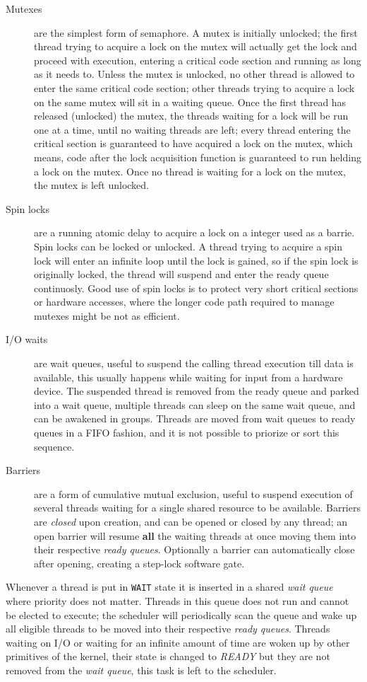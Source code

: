 \documentclass[11pt,b5paper]{scrbook}
\begin{document}
\begin{description}
\item[Mutexes] are the simplest form of semaphore. A mutex is initially
unlocked; the first thread trying to acquire a lock on the mutex will actually get the lock
and proceed with execution, entering a critical code section and running as long as it needs to.
Unless the mutex is unlocked, no other thread is allowed to enter the same
critical code section; other threads trying to acquire a lock on the same mutex will sit in a
waiting queue. 
Once the first thread has released (unlocked) the mutex, the threads waiting for 
a lock will be run one at a time, until no waiting threads are left; every thread entering the
critical section is guaranteed to have acquired a lock on the mutex, which means, 
code after the lock acquisition function is guaranteed to run helding a lock on the mutex.
Once no thread is waiting for a lock on the mutex, the mutex is left unlocked.
\item[Spin locks] are a running  atomic delay to acquire a lock on a integer used as a
barrie. Spin locks can be locked or unlocked.
A thread trying to acquire a spin lock will enter an infinite loop until the lock is 
gained, so if the spin lock is originally locked, the thread will suspend and enter
the ready queue continuosly.
Good use of spin locks is to protect very short critical sections or hardware accesses,
where the longer code path required to manage mutexes might be not as efficient.
\item[I/O waits] are wait queues, useful to suspend the calling thread execution till 
data is available, this usually happens while waiting for input from a hardware device.
The suspended thread is removed from the ready queue and parked into a wait queue, multiple
threads can sleep on the same wait queue, and can be awakened in groups.
Threads are moved from wait queues to ready queues in a FIFO fashion, and it is not possible
to priorize or sort this sequence.
\item[Barriers] are a form of cumulative mutual exclusion, useful to suspend execution of several
threads waiting for a single shared resource to be available.
Barriers are \textit{closed} upon creation, and can be opened or closed by any thread; an open barrier will
resume \textbf{all} the waiting threads at once moving them into their respective \textit{ready queues}.
Optionally a barrier can automatically close after opening, creating a step-lock software gate.
\end{description}

Whenever a thread is put in \texttt{WAIT} state it is inserted in a shared \textit{wait queue} where
priority does not matter.
Threads in this queue does not run and cannot be elected to execute; the scheduler will periodically
scan the queue and wake up all eligible threads to be moved into their respective \textit{ready queues}.
Threads waiting on I/O or waiting for an infinite amount of time are woken up by other primitives of the
kernel, their state is changed to \textit{READY} but they are not removed from the \textit{wait queue},
this task is left to the scheduler.
\end{document}
